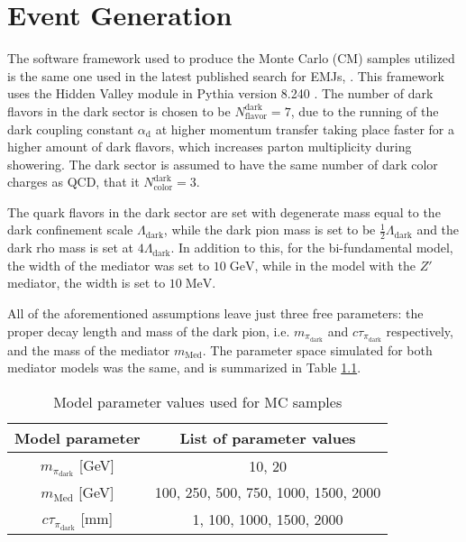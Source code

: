 \chapter{Event Generation}

The software framework used to produce the Monte Carlo (CM) samples utilized is the same one used in the latest published search for EMJs, \cite{cmscollaborationSearchNewPhysics2024}. This framework uses the Hidden Valley module \cite{carloniVisibleEffectsInvisible2010, carloniDiscerningSecludedSector2011} in Pythia version 8.240 \cite{sjostrandIntroductionPYTHIA822015}. The number of dark flavors in the dark sector is chosen to be $N_{\text{flavor}}^{\text{dark}} = 7$, due to the running of the dark coupling constant $\alpha_{\text{d}}$ at higher momentum transfer taking place faster for a higher amount of dark flavors, which increases parton multiplicity during showering. The dark sector is assumed to have the same number of dark color charges as QCD, that it $N_{\text{color}}^{\text{dark}} = 3$.

The quark flavors in the dark sector are set with degenerate mass equal to the dark confinement scale $\Lambda_{\text{dark}}$, while the dark pion mass is set to be $\frac12 \Lambda_{\text{dark}}$ and the dark rho mass is set at $4\Lambda_{\text{dark}}$. In addition to this, for the bi-fundamental model, the width of the mediator was set to $10\;\text{GeV}$, while in the model with the $Z'$ mediator, the width is set to $10\;\text{MeV}$.

All of the aforementioned assumptions leave just three free parameters: the proper decay length and mass of the dark pion, i.e. $m_{\pi_{\text{dark}}}$ and $c\tau_{\pi_{\text{dark}}}$ respectively, and the mass of the mediator $m_{\text{Med}}$. The parameter space simulated for both mediator models was the same, and is summarized in Table \ref{tab:param_vals}.

\begin{table}[]
    \centering
    \begin{tabular}{|c|c|}
        \hline
        Model parameter & List of parameter values \\
        \hline
        $m_{\pi_{\text{dark}}}$ [GeV]   &   10, 20 \\
        $m_{\text{Med}}$ [GeV]          & 100, 250, 500, 750, 1000, 1500, 2000 \\
        $c\tau_{\pi_{\text{dark}}}$ [mm]& 1, 100, 1000, 1500, 2000\\
        \hline
    \end{tabular}
    \caption{Model parameter values used for MC samples}
    \label{tab:param_vals}
\end{table}

